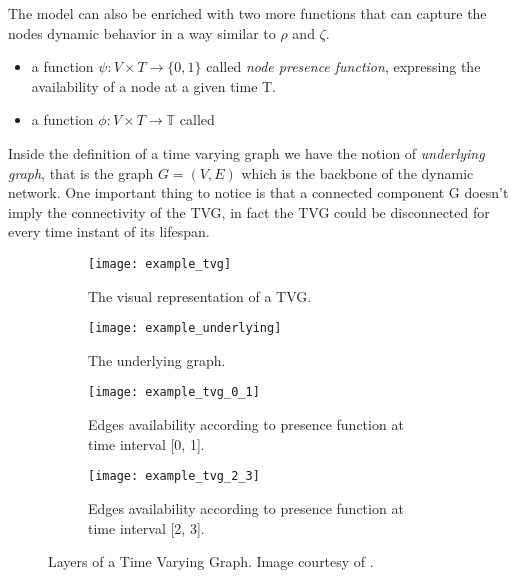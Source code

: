 	The model can also be enriched with two more functions that can capture the nodes dynamic behavior in a way similar to \(\rho\) and \(\zeta\).
	\begin{itemize}
		\item a function \(\psi : V \times T \to \{0, 1\}\) called \textit{node presence function}, expressing the availability of a node at a given time T.
		
		\item a function \(\phi : V \times T \to \mathbb{T}\) called 
	\end{itemize}
	
	Inside the definition of a time varying graph we have the notion of \textit{underlying graph}, that is the graph \(G = (V, E)\) which is the backbone of the dynamic network. One important thing to notice is that a connected component G doesn't imply the connectivity of the TVG, in fact the TVG could be disconnected for every time instant of its lifespan.
	
	\begin{figure}
		\begin{subfigure}{0.5\textwidth}
			\centering
			\texttt{[image: example\_tvg]}
			\caption{The visual representation of a TVG.}
		\end{subfigure}
		\begin{subfigure}{0.5\textwidth}
			\centering
			\texttt{[image: example\_underlying]}
			\caption{The underlying graph.}
		\end{subfigure}
		\begin{subfigure}{0.5\textwidth}
			\centering
			\texttt{[image: example\_tvg\_0\_1]}
			\caption{Edges availability according to presence function at time interval [0, 1].}
		\end{subfigure}
		\begin{subfigure}{0.5\textwidth}
			\centering
			\texttt{[image: example\_tvg\_2\_3]}
			\caption{Edges availability according to presence function at time interval [2, 3].}
		\end{subfigure}
		\caption{Layers of a Time Varying Graph. Image courtesy of \cite{Casteigts2012}.}
	\end{figure}
	
